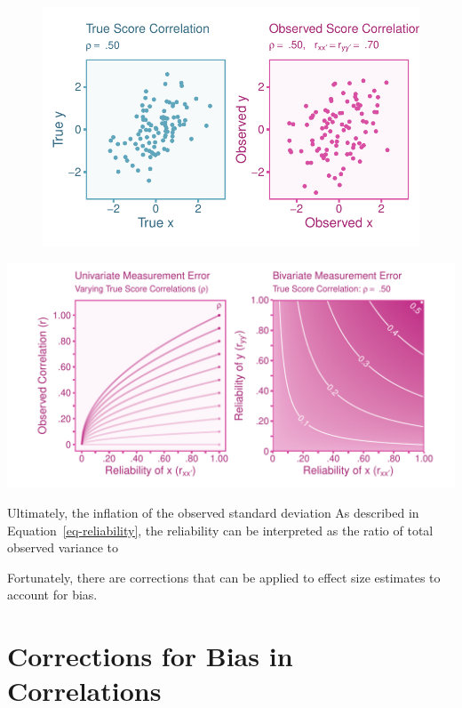 \documentclass[
  letterpaper,
  DIV=11,
  numbers=noendperiod]{scrreprt}
\begin{document}
\begin{figure}[H]

{\centering \includegraphics{unreliability_files/figure-pdf/unnamed-chunk-15-1.pdf}

}

\end{figure}

\includegraphics{unreliability_files/figure-pdf/unnamed-chunk-16-1.pdf}

Ultimately, the inflation of the observed standard deviation As
described in Equation~\ref{eq-reliability}, the reliability can be
interpreted as the ratio of total observed variance to

Fortunately, there are corrections that can be applied to effect size
estimates to account for bias.

\hypertarget{corrections-for-bias-in-correlations}{%
\section{Corrections for Bias in
Correlations}\label{corrections-for-bias-in-correlations}}
\end{document}
